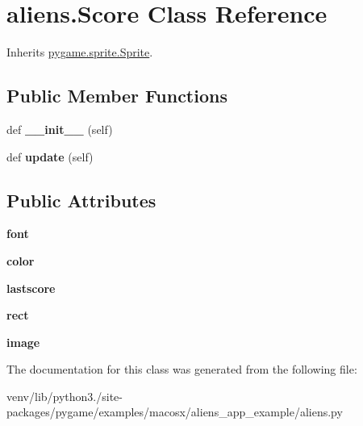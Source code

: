 \hypertarget{classaliens_1_1_score}{}\section{aliens.\+Score Class Reference}
\label{classaliens_1_1_score}


Inherits \hyperlink{classpygame_1_1sprite_1_1_sprite}{pygame.\+sprite.\+Sprite}.

\subsection*{Public Member Functions}
\begin{DoxyCompactItemize}
\item 
\mbox{\label{classaliens_1_1_score_a7f2807df510c00fdef88cb13d18ba746}} 
def {\bfseries \+\_\+\+\_\+init\+\_\+\+\_\+} (self)
\item 
\mbox{\label{classaliens_1_1_score_a29bce98636bdc54cf9256059e7690d53}} 
def {\bfseries update} (self)
\end{DoxyCompactItemize}
\subsection*{Public Attributes}
\begin{DoxyCompactItemize}
\item 
\mbox{\label{classaliens_1_1_score_a02857c849e247fe7d598cab79dc4ed58}} 
{\bfseries font}
\item 
\mbox{\label{classaliens_1_1_score_a12c7c2631ac0ef1d017f9796c447b560}} 
{\bfseries color}
\item 
\mbox{\label{classaliens_1_1_score_ac44b490bd2b7e663711025e015531a1d}} 
{\bfseries lastscore}
\item 
\mbox{\label{classaliens_1_1_score_af538e4e5a87ef98b6585048dc3e5eefd}} 
{\bfseries rect}
\item 
\mbox{\label{classaliens_1_1_score_abb27673e45d1e20eef6669b5ae8cc0a1}} 
{\bfseries image}
\end{DoxyCompactItemize}


The documentation for this class was generated from the following file\+:\begin{DoxyCompactItemize}
\item 
venv/lib/python3./site-\/packages/pygame/examples/macosx/aliens\+\_\+app\+\_\+example/aliens.\+py\end{DoxyCompactItemize}
